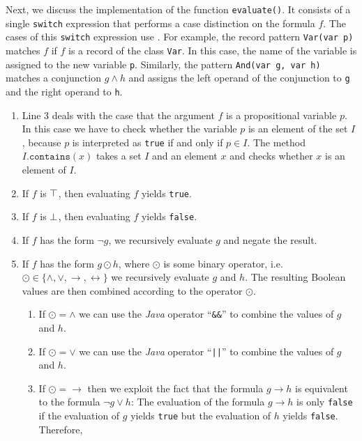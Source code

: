 \noindent
Next, we discuss the implementation of the function \texttt{evaluate()}.  It consists of a single
\texttt{switch} expression that performs a case distinction on the formula $f$.  The cases of this
\texttt{switch} expression use .   For example, the record pattern
\texttt{Var(var p)} matches $f$ if $f$ is a record of the class \texttt{Var}.  In this case, the name of the
variable is assigned to the new variable \texttt{p}.  Similarly, the pattern \texttt{And(var g, var h)} matches
a conjunction $g \wedge h$ and assigns the left operand of the conjunction to \texttt{g} and the right operand to
\texttt{h}.
\begin{enumerate}
\item Line 3 deals with the case that the argument $f$ is a propositional variable $p$.  
      In this case we have to check whether the variable $p$ is an element of the set $I$, because $p$ is
      interpreted as \texttt{true} if and only if $p \in I$.  The method $I\mathtt{.contains}(x)$
      takes a set $I$ and an element $x$ and checks whether $x$ is an element of $I$.
\item If $f$ is $\top$, then evaluating $f$ yields \texttt{true}.
\item If $f$ is $\bot$, then evaluating $f$ yields \texttt{false}. 
\item If $f$ has the form $\neg g$, we recursively evaluate $g$  and negate the result.
\item If $f$ has the form $g \odot h$, where $\odot$ is some binary operator, i.e.~
      $\odot \in \{\wedge, \vee, \rightarrow, \leftrightarrow\}$ we recursively evaluate
      $g$ and $h$.  The resulting Boolean values are then combined according to the operator $\odot$.
      \begin{enumerate}
      \item If $\odot = \wedge$ we can use the \textsl{Java} operator ``\texttt{\&\&}''
            to combine the values of $g$ and $h$.
      \item If $\odot = \vee$ we can use the \textsl{Java} operator ``\texttt{||}''
            to combine the values of $g$ and $h$.
      \item If $\odot = \rightarrow$ then we exploit the fact that the formula $g \rightarrow h$ is equivalent
            to the formula $\neg g \vee h$:  The evaluation of the formula $g \rightarrow h$ is only
            \texttt{false} if the evaluation of $g$ yields \texttt{true} but the evaluation of $h$ yields
            \texttt{false}.  Therefore, 

\end{enumerate}
\end{enumerate}

